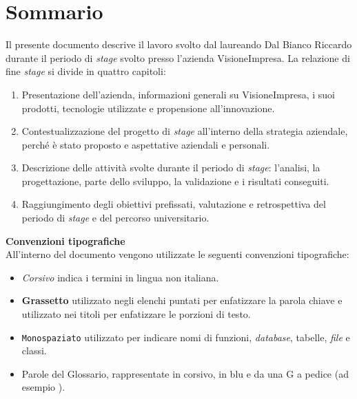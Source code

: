 \cleardoublepage
{}
{}
\begingroup
\let\clearpage\relax
\let\cleardoublepage\relax
\chapter*{Sommario}

Il presente documento descrive il lavoro svolto dal laureando Dal Bianco Riccardo durante il periodo di \textit{stage} svolto presso l'azienda VisioneImpresa.
La relazione di fine \textit{stage} si divide in quattro capitoli:
\begin{enumerate}
		\item Presentazione dell'azienda, informazioni generali su VisioneImpresa, i suoi prodotti, tecnologie utilizzate e propensione all'innovazione.
		\item  Contestualizzazione del progetto di \textit{stage} all'interno della strategia aziendale, perché è stato proposto e aspettative aziendali e personali.
		\item Descrizione delle attività svolte durante il periodo di \textit{stage}: l'analisi, la progettazione, parte dello sviluppo, la validazione e i risultati conseguiti.
		\item Raggiungimento degli obiettivi prefissati, valutazione e retrospettiva del periodo di \textit{stage} e del percorso universitario.
\end{enumerate}

\textbf{Convenzioni tipografiche} \\
All'interno del documento vengono utilizzate le seguenti convenzioni tipografiche:
\begin{itemize}
	\item \textit{Corsivo} indica i termini in lingua non italiana.
	\item \textbf{Grassetto} utilizzato negli elenchi puntati per enfatizzare la parola chiave e utilizzato nei titoli per enfatizzare le porzioni di testo.
	\item \texttt{Monospaziato} utilizzato per indicare nomi di funzioni, \textit{database}, tabelle, \textit{file} e classi.
	\item Parole del Glossario, rappresentate in corsivo, in blu e da una G a pedice (ad esempio ).
\end{itemize}

\endgroup
\vfill
